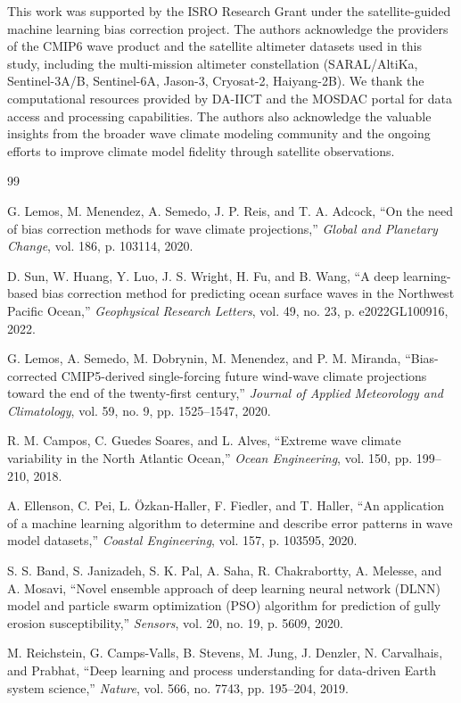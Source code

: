 \documentclass[twocolumn]{article}
\begin{document}
This work was supported by the ISRO Research Grant under the satellite-guided machine learning bias correction project. The authors acknowledge the providers of the CMIP6 wave product and the satellite altimeter datasets used in this study, including the multi-mission altimeter constellation (SARAL/AltiKa, Sentinel-3A/B, Sentinel-6A, Jason-3, Cryosat-2, Haiyang-2B). We thank the computational resources provided by DA-IICT and the MOSDAC portal for data access and processing capabilities. The authors also acknowledge the valuable insights from the broader wave climate modeling community and the ongoing efforts to improve climate model fidelity through satellite observations.

\begin{thebibliography}{99}

G. Lemos, M. Menendez, A. Semedo, J. P. Reis, and T. A. Adcock, ``On the need of bias correction methods for wave climate projections,'' \textit{Global and Planetary Change}, vol. 186, p. 103114, 2020.

D. Sun, W. Huang, Y. Luo, J. S. Wright, H. Fu, and B. Wang, ``A deep learning-based bias correction method for predicting ocean surface waves in the Northwest Pacific Ocean,'' \textit{Geophysical Research Letters}, vol. 49, no. 23, p. e2022GL100916, 2022.

G. Lemos, A. Semedo, M. Dobrynin, M. Menendez, and P. M. Miranda, ``Bias-corrected CMIP5-derived single-forcing future wind-wave climate projections toward the end of the twenty-first century,'' \textit{Journal of Applied Meteorology and Climatology}, vol. 59, no. 9, pp. 1525--1547, 2020.

R. M. Campos, C. Guedes Soares, and L. Alves, ``Extreme wave climate variability in the North Atlantic Ocean,'' \textit{Ocean Engineering}, vol. 150, pp. 199--210, 2018.

A. Ellenson, C. Pei, L. Özkan-Haller, F. Fiedler, and T. Haller, ``An application of a machine learning algorithm to determine and describe error patterns in wave model datasets,'' \textit{Coastal Engineering}, vol. 157, p. 103595, 2020.

S. S. Band, S. Janizadeh, S. K. Pal, A. Saha, R. Chakrabortty, A. Melesse, and A. Mosavi, ``Novel ensemble approach of deep learning neural network (DLNN) model and particle swarm optimization (PSO) algorithm for prediction of gully erosion susceptibility,'' \textit{Sensors}, vol. 20, no. 19, p. 5609, 2020.

M. Reichstein, G. Camps-Valls, B. Stevens, M. Jung, J. Denzler, N. Carvalhais, and Prabhat, ``Deep learning and process understanding for data-driven Earth system science,'' \textit{Nature}, vol. 566, no. 7743, pp. 195--204, 2019.

\end{thebibliography}
\end{document}
